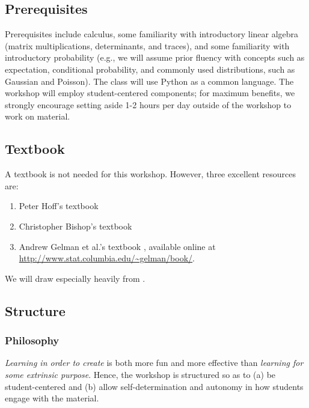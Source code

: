 \documentclass{article} %
\begin{document}
\subsection{Prerequisites} Prerequisites include calculus,  some familiarity with introductory linear algebra (matrix multiplications,  determinants,  and traces),  and some familiarity with introductory probability (e.g.,  we will assume prior fluency with concepts such as expectation,  conditional probability,  and commonly used distributions,  such as Gaussian and Poisson).    The class will use Python as a common language.     The workshop will employ student-centered components;  for maximum benefits, we strongly encourage setting aside 1-2 hours per day outside of the workshop to work on material.    %

\subsection{Textbook}

A textbook is not needed for this workshop.  However,  three excellent resources are:

\begin{enumerate}
\item Peter Hoff's textbook \cite{hoff2009first}
\item Christopher Bishop's textbook \cite{bishop2006pattern}
\item Andrew Gelman et al.'s textbook \cite{gelman2013bayesian},  available online at \url{http://www.stat.columbia.edu/~gelman/book/}. 
\end{enumerate}

We will draw especially heavily from \cite{hoff2009first}.

\subsection{Structure}

\subsubsection{Philosophy}

\textit{Learning in order to create} is both more fun and more effective than \textit{learning for some extrinsic purpose}.   Hence,  the workshop is structured so as to (a) be student-centered and (b) allow self-determination and autonomy in how students engage with the material. 
\end{document}
